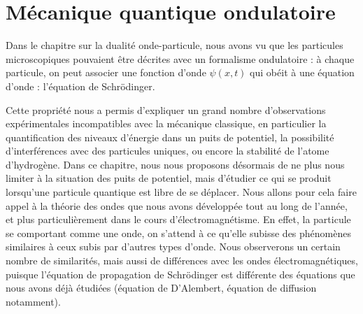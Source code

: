 \documentclass[11pt,fleqn]{book} %
\begin{document}










\setcounter{chapter}{19}

\chapter{Mécanique quantique ondulatoire}

Dans le chapitre sur la dualité onde-particule, nous avons vu que les particules microscopiques pouvaient être décrites avec un formalisme ondulatoire : à chaque particule, on peut associer une fonction d'onde $\psi(x,t)$ qui obéit à une équation d'onde : l'équation de Schrödinger. 

Cette propriété nous a permis d'expliquer un grand nombre d'observations expérimentales incompatibles avec la mécanique classique, en particulier la quantification des niveaux d'énergie dans un puits de potentiel, la possibilité d'interférences avec des particules uniques, ou encore la stabilité de l'atome d'hydrogène. Dans ce chapitre, nous nous proposons désormais de ne plus nous limiter à la situation des puits de potentiel, mais d'étudier ce qui se produit lorsqu'une particule quantique est libre de se déplacer. Nous allons pour cela faire appel à la théorie des ondes que nous avons développée tout au long de l'année, et plus particulièrement dans le cours d'électromagnétisme. En effet, la particule se comportant comme une onde, on s'attend à ce qu'elle subisse des phénomènes similaires à ceux subis par d'autres types d'onde. Nous observerons un certain nombre de similarités, mais aussi de différences avec les ondes électromagnétiques, puisque l'équation de propagation de Schrödinger est différente des équations que nous avons déjà étudiées (équation de D'Alembert, équation de diffusion notamment).
\end{document}
